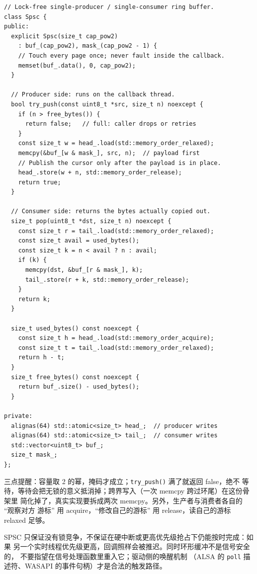 \documentclass[12pt,a4paper,fontset=fandol]{ctexbook}
\newcommand{\Fn}[1]{\texttt{#1()}}
\newcommand{\Tp}[1]{\texttt{#1}}
\begin{document}
\begin{lstlisting}[style=cppstyle,caption={带显式内存序与缓存行填充的 SPSC 环形缓冲},label={lst:ch12-ring}]
// Lock-free single-producer / single-consumer ring buffer.
class Spsc {
public:
  explicit Spsc(size_t cap_pow2)
    : buf_(cap_pow2), mask_(cap_pow2 - 1) {
    // Touch every page once; never fault inside the callback.
    memset(buf_.data(), 0, cap_pow2);
  }

  // Producer side: runs on the callback thread.
  bool try_push(const uint8_t *src, size_t n) noexcept {
    if (n > free_bytes()) {
      return false;   // full: caller drops or retries
    }
    const size_t w = head_.load(std::memory_order_relaxed);
    memcpy(&buf_[w & mask_], src, n);  // payload first
    // Publish the cursor only after the payload is in place.
    head_.store(w + n, std::memory_order_release);
    return true;
  }

  // Consumer side: returns the bytes actually copied out.
  size_t pop(uint8_t *dst, size_t n) noexcept {
    const size_t r = tail_.load(std::memory_order_relaxed);
    const size_t avail = used_bytes();
    const size_t k = n < avail ? n : avail;
    if (k) {
      memcpy(dst, &buf_[r & mask_], k);
      tail_.store(r + k, std::memory_order_release);
    }
    return k;
  }

  size_t used_bytes() const noexcept {
    const size_t h = head_.load(std::memory_order_acquire);
    const size_t t = tail_.load(std::memory_order_relaxed);
    return h - t;
  }
  size_t free_bytes() const noexcept {
    return buf_.size() - used_bytes();
  }

private:
  alignas(64) std::atomic<size_t> head_;  // producer writes
  alignas(64) std::atomic<size_t> tail_;  // consumer writes
  std::vector<uint8_t> buf_;
  size_t mask_;
};
\end{lstlisting}

三点提醒：容量取 2 的幂，掩码才成立；\Fn{try\_push} 满了就返回 false，绝不
等待，等待会把无锁的意义抵消掉；跨界写入（一次 memcpy 跨过环尾）在这份骨架里
简化掉了，真实实现要拆成两次 memcpy。另外，生产者与消费者各自的 ``观察对方
游标'' 用 acquire，``修改自己的游标'' 用 release，读自己的游标 relaxed 足够。

\begin{warning}[title={无锁不等于无等待，也不等于可重入}]
SPSC 只保证没有锁竞争，不保证在硬中断或更高优先级抢占下仍能按时完成：如果
另一个实时线程优先级更高，回调照样会被推迟。同时环形缓冲不是信号安全的，
不要指望在信号处理函数里重入它；驱动侧的唤醒机制
（ALSA 的 \Tp{poll} 描述符、WASAPI 的事件句柄）才是合法的触发路径。
\end{warning}
\end{document}
